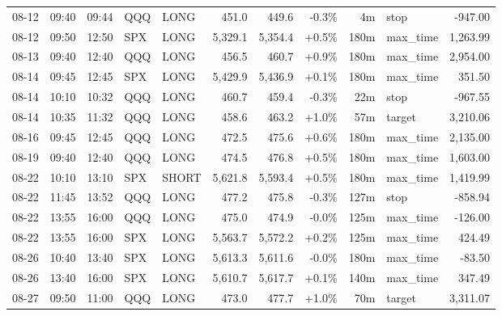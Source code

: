 \documentclass[11pt,a4paper,twoside]{article}
\begin{document}
\begin{center}
\begin{longtable}{>{\color{txtmain}}l l l l l r r r r >{\color{txtmain}}l r}
08-12 & 09:40 & 09:44 & QQQ & LONG & 451.0 & 449.6 & \textcolor{lossred}{-0.3\%} & 4m & stop & \textcolor{lossred}{-947.00} \\
08-12 & 09:50 & 12:50 & SPX & LONG & 5,329.1 & 5,354.4 & \textcolor{wingreen}{+0.5\%} & 180m & max\_time & \textcolor{wingreen}{1,263.99} \\
08-13 & 09:40 & 12:40 & QQQ & LONG & 456.5 & 460.7 & \textcolor{wingreen}{+0.9\%} & 180m & max\_time & \textcolor{wingreen}{2,954.00} \\
08-14 & 09:45 & 12:45 & SPX & LONG & 5,429.9 & 5,436.9 & \textcolor{wingreen}{+0.1\%} & 180m & max\_time & \textcolor{wingreen}{351.50} \\
08-14 & 10:10 & 10:32 & QQQ & LONG & 460.7 & 459.4 & \textcolor{lossred}{-0.3\%} & 22m & stop & \textcolor{lossred}{-967.55} \\
08-14 & 10:35 & 11:32 & QQQ & LONG & 458.6 & 463.2 & \textcolor{wingreen}{+1.0\%} & 57m & target & \textcolor{wingreen}{3,210.06} \\
08-16 & 09:45 & 12:45 & QQQ & LONG & 472.5 & 475.6 & \textcolor{wingreen}{+0.6\%} & 180m & max\_time & \textcolor{wingreen}{2,135.00} \\
08-19 & 09:40 & 12:40 & QQQ & LONG & 474.5 & 476.8 & \textcolor{wingreen}{+0.5\%} & 180m & max\_time & \textcolor{wingreen}{1,603.00} \\
08-22 & 10:10 & 13:10 & SPX & SHORT & 5,621.8 & 5,593.4 & \textcolor{wingreen}{+0.5\%} & 180m & max\_time & \textcolor{wingreen}{1,419.99} \\
08-22 & 11:45 & 13:52 & QQQ & LONG & 477.2 & 475.8 & \textcolor{lossred}{-0.3\%} & 127m & stop & \textcolor{lossred}{-858.94} \\
08-22 & 13:55 & 16:00 & QQQ & LONG & 475.0 & 474.9 & \textcolor{lossred}{-0.0\%} & 125m & max\_time & \textcolor{lossred}{-126.00} \\
08-22 & 13:55 & 16:00 & SPX & LONG & 5,563.7 & 5,572.2 & \textcolor{wingreen}{+0.2\%} & 125m & max\_time & \textcolor{wingreen}{424.49} \\
08-26 & 10:40 & 13:40 & SPX & LONG & 5,613.3 & 5,611.6 & \textcolor{lossred}{-0.0\%} & 180m & max\_time & \textcolor{lossred}{-83.50} \\
08-26 & 13:40 & 16:00 & SPX & LONG & 5,610.7 & 5,617.7 & \textcolor{wingreen}{+0.1\%} & 140m & max\_time & \textcolor{wingreen}{347.49} \\
08-27 & 09:50 & 11:00 & QQQ & LONG & 473.0 & 477.7 & \textcolor{wingreen}{+1.0\%} & 70m & target & \textcolor{wingreen}{3,311.07} \\

\end{longtable}
\end{center}
\end{document}
